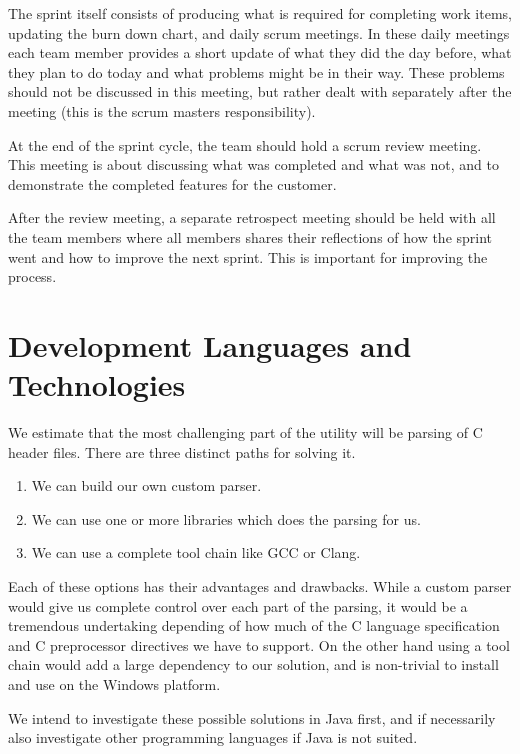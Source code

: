 The sprint itself consists of producing what is required for completing work
items, updating the burn down chart, and daily scrum meetings. In these daily
meetings each team member provides a short update of what they did the day
before, what they plan to do today and what problems might be in their way.
These problems should not be discussed in this meeting, but rather dealt with
separately after the meeting (this is the scrum masters responsibility).

At the end of the sprint cycle, the team should hold a scrum review meeting.
This meeting is about discussing what was completed and what was not, and to
demonstrate the completed features for the customer.

After the review meeting, a separate retrospect meeting should be held with all
the team members where all members shares their reflections of how the sprint
went and how to improve the next sprint. This is important for improving the
process.

\section{Development Languages and Technologies}
\label{sec:pre:langs}

We estimate that the most challenging part of the utility will be parsing of C
header files. There are three distinct paths for solving it.
\begin{enumerate}
	\item We can build our own custom parser.
	\item We can use one or more libraries which does the parsing for us.
	\item We can use a complete tool chain like GCC or Clang.
\end{enumerate}

\noindent Each of these options has their advantages and drawbacks. While a
custom parser would give us complete control over each part of the parsing, it
would be a tremendous undertaking depending of how much of the C language
specification and C preprocessor directives we have to support. On the other
hand using a tool chain would add a large dependency to our solution, and is
non-trivial to install and use on the Windows platform.

We intend to investigate these possible solutions in Java first, and if
necessarily also investigate other programming languages if Java is not suited.

